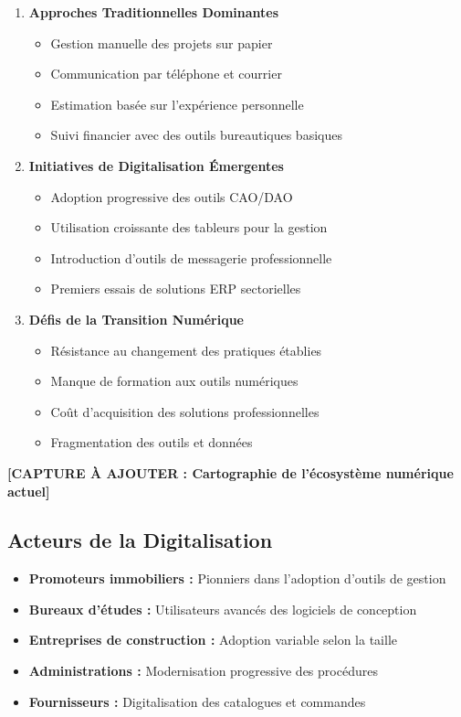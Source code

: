 \begin{enumerate}
    \item \textbf{Approches Traditionnelles Dominantes}
    \begin{itemize}
        \item Gestion manuelle des projets sur papier
        \item Communication par téléphone et courrier
        \item Estimation basée sur l'expérience personnelle
        \item Suivi financier avec des outils bureautiques basiques
    \end{itemize}
    
    \item \textbf{Initiatives de Digitalisation Émergentes}
    \begin{itemize}
        \item Adoption progressive des outils CAO/DAO
        \item Utilisation croissante des tableurs pour la gestion
        \item Introduction d'outils de messagerie professionnelle
        \item Premiers essais de solutions ERP sectorielles
    \end{itemize}
    
    \item \textbf{Défis de la Transition Numérique}
    \begin{itemize}
        \item Résistance au changement des pratiques établies
        \item Manque de formation aux outils numériques
        \item Coût d'acquisition des solutions professionnelles
        \item Fragmentation des outils et données
    \end{itemize}
\end{enumerate}

\textbf{[CAPTURE À AJOUTER : Cartographie de l'écosystème numérique actuel]}

\subsection{Acteurs de la Digitalisation}

\begin{itemize}
    \item \textbf{Promoteurs immobiliers :} Pionniers dans l'adoption d'outils de gestion
    \item \textbf{Bureaux d'études :} Utilisateurs avancés des logiciels de conception
    \item \textbf{Entreprises de construction :} Adoption variable selon la taille
    \item \textbf{Administrations :} Modernisation progressive des procédures
    \item \textbf{Fournisseurs :} Digitalisation des catalogues et commandes
\end{itemize}

